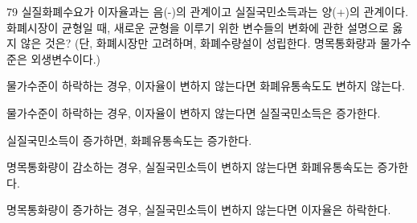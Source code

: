 \begin{question}{79}
실질화폐수요가 이자율과는 음(-)의 관계이고 실질국민소득과는 양(+)의 관계이다. 화폐시장이 균형일 때, 새로운 균형을 이루기 위한 변수들의 변화에 관한 설명으로 옳지 않은 것은? (단, 화폐시장만 고려하며, 화폐수량설이 성립한다. 명목통화량과 물가수준은 외생변수이다.)
\begin{choices}
  \item 물가수준이 하락하는 경우, 이자율이 변하지 않는다면 화폐유통속도도 변하지 않는다.
  \item 물가수준이 하락하는 경우, 이자율이 변하지 않는다면 실질국민소득은 증가한다.
  \item 실질국민소득이 증가하면, 화폐유통속도는 증가한다.
  \item 명목통화량이 감소하는 경우, 실질국민소득이 변하지 않는다면 화폐유통속도는 증가한다.
  \item 명목통화량이 증가하는 경우, 실질국민소득이 변하지 않는다면 이자율은 하락한다.
\end{choices}
\end{question}
\answerall
{}

